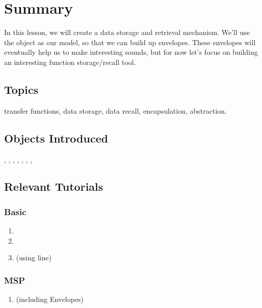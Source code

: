 

\graphicspath{{\imagedir}}

\date{\today}


\maketitle

\section*{Summary}
In this lesson, we will create a data storage and retrieval mechanism.  We'll use the  object as our model, so that we can build up envelopes.  These envelopes will eventually help us to make interesting sounds, but for now let's focus on building an interesting function storage/recall tool.

\subsection*{Topics}
transfer functions, data storage, data recall, encapsulation, abstraction.

\subsection*{Objects Introduced}
, , , , , , , 

\subsection*{Relevant Tutorials}
\subsubsection*{Basic}
\begin{enumerate}
\item {}
\item {}
\item {} (using line)
\end{enumerate}
\subsubsection*{MSP}
\begin{enumerate}
\item {} (including Envelopes)
\end{enumerate}


